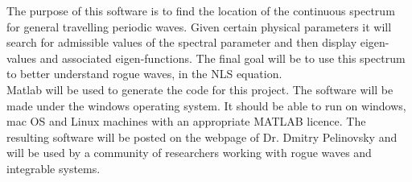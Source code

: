 \documentclass{article}
\begin{document}
The purpose of this software is to find the location of the continuous spectrum for general travelling periodic waves. Given certain physical parameters it will search for admissible values of the spectral parameter and then display eigen-values and associated eigen-functions. The final goal will be to use this spectrum to better understand rogue waves, in the NLS equation.  \\ 

Matlab will be used to generate the code for this project. The software will be
made under the windows operating system. It should be able to run on windows,
mac OS and Linux machines with an appropriate MATLAB licence. The resulting
software will be posted on the webpage of Dr. Dmitry Pelinovsky  and will be used by a community of researchers working with rogue waves and integrable systems. 

\end{document}
